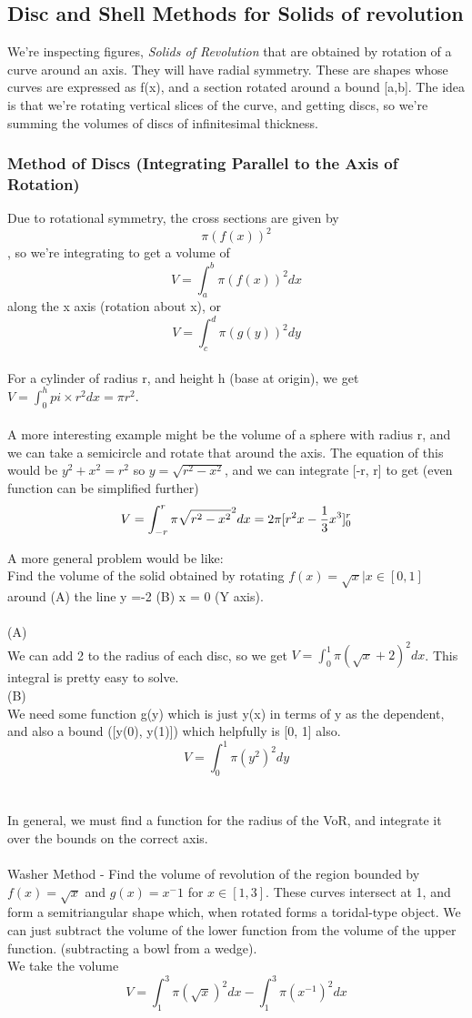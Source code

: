 \documentclass[twocolumn, 12pt]{report}
\begin{document}
\subsection{Disc and Shell Methods for Solids of revolution}
We're inspecting figures, \textit{Solids of Revolution} that are obtained by rotation of a curve around an axis. They will have radial symmetry. These are shapes whose curves are expressed as f(x), and a section rotated around a bound [a,b]. The idea is that we're rotating vertical slices of the curve, and getting discs, so we're summing the volumes of discs of infinitesimal thickness.
\subsubsection{Method of Discs (Integrating Parallel to the Axis of Rotation)}
Due to rotational symmetry, the cross sections are given by $$\pi (f(x))^2$$, so we're integrating to get a volume of $$V = \int_a^b \pi (f(x))^2 dx$$ along the x axis (rotation about x), or $$V = \int_c^d \pi (g(y))^2 dy$$ \\ For a cylinder of radius r, and height h (base at origin), we get $V = \int_0^h pi\times r^2 dx = \pi r^2$. \\\\A more interesting example might be the volume of a sphere with radius r, and we can take a semicircle and rotate that around the axis. The equation of this would be $y^2 + x ^2 = r^2$ so $y = \sqrt{r^2 - x^2}$, and we can integrate [-r, r] to get (even function can be simplified further) $$V = \int_{-r}^r  \pi \sqrt{r^2 - x^2}^2dx \\ = 2\pi [r^2 x -\frac{1}{3}x^3]^r_0$$

A more general problem would be like: \\Find the volume of the solid obtained by rotating $f(x) = \sqrt{x} | x\in[0,1]$ around (A) the line y  =-2 (B) x = 0 (Y axis).\\\\ (A) \\We can add 2 to the radius of each disc, so we get $V = \int_0^1 \pi (\sqrt x + 2)^2 dx$. This integral is pretty easy to solve. \\ (B)\\ We need some function g(y) which is just y(x) in terms of y as the dependent, and also a bound ([y(0), y(1)]) which helpfully is [0, 1] also. $$V = \int_0^1 \pi (y^2)^2 dy$$ \\\\ In general, we must find a function for the radius of the VoR, and integrate it over the bounds on the correct axis. \\\\ Washer Method - Find the volume of revolution of the region bounded by $f(x) = \sqrt{x}$ and $g(x) = x^-1$ for $x\in[1,3]$. These curves intersect at 1, and form a semitriangular shape which, when rotated forms a toridal-type object. We can just subtract the volume of the lower function from the volume of the upper function. (subtracting a bowl from a wedge). \\ We take the volume $$V = \int_1^3 \pi(\sqrt{x})^2 dx - \int_1^3 \pi (x^{-1})^2 dx$$
\end{document}
